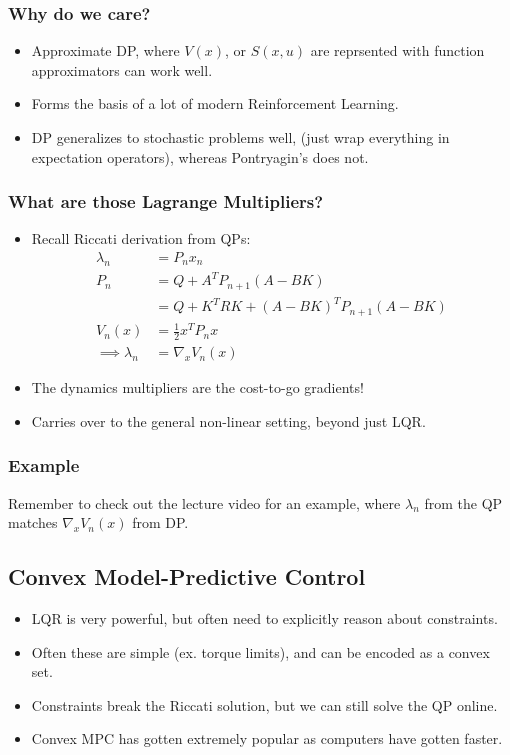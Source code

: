 \subsubsection{Why do we care?}
\begin{itemize}
    \item Approximate DP, where $V(x)$, or $S(x,u)$ are reprsented with function approximators can work well. 
    \item Forms the basis of a lot of modern Reinforcement Learning. 
    \item DP generalizes to stochastic problems well, (just wrap everything in expectation operators), whereas Pontryagin's does not. 
\end{itemize}

\subsubsection{What are those Lagrange Multipliers?}
\begin{itemize}
    \item Recall Riccati derivation from QPs:
    \begin{align}
        \lambda_n &= P_n x_n \\
        P_n &= Q + A^T P_{n+1} (A-BK) \\
        &= Q + K^T R K + (A-BK)^T P_{n+1} (A-BK) \\
        V_n(x) &= \frac{1}{2} x^T P_n x \\
        \implies \lambda_n &= \nabla_x V_n(x)
    \end{align}
    \item The dynamics multipliers are the cost-to-go gradients! 
    \item Carries over to the general non-linear setting, beyond just LQR. 
\end{itemize}

\subsubsection{Example}
Remember to check out the lecture video for an example, where $\lambda_n$ from the QP matches $\nabla_x V_n(x)$ from DP. 

\subsection{Convex Model-Predictive Control}
\begin{itemize}
    \item LQR is very powerful, but often need to explicitly reason about constraints. 
    \item Often these are simple (ex. torque limits), and can be encoded as a convex set. 
    \item Constraints break the Riccati solution, but we can still solve the QP online. 
    \item Convex MPC has gotten extremely popular as computers have gotten faster. 
\end{itemize}

